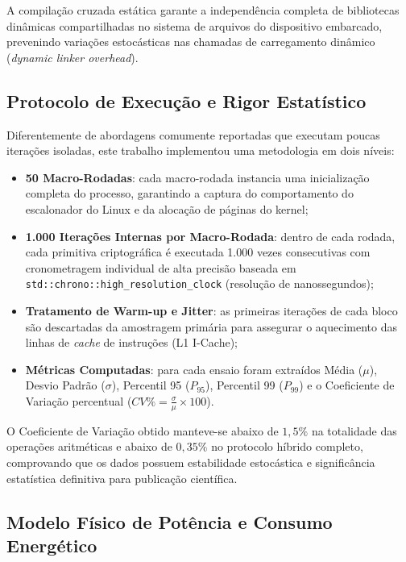 A compilação cruzada estática garante a independência completa de bibliotecas dinâmicas compartilhadas no sistema de arquivos do dispositivo embarcado, prevenindo variações estocásticas nas chamadas de carregamento dinâmico (\textit{dynamic linker overhead}).

\subsection{Protocolo de Execução e Rigor Estatístico}
\label{subsec:rigor_estatistico}

Diferentemente de abordagens comumente reportadas que executam poucas iterações isoladas, este trabalho implementou uma metodologia em dois níveis:
\begin{itemize}
    \item \textbf{50 Macro-Rodadas}: cada macro-rodada instancia uma inicialização completa do processo, garantindo a captura do comportamento do escalonador do Linux e da alocação de páginas do kernel;
    \item \textbf{1.000 Iterações Internas por Macro-Rodada}: dentro de cada rodada, cada primitiva criptográfica é executada 1.000 vezes consecutivas com cronometragem individual de alta precisão baseada em \texttt{std::chrono::high\_resolution\_clock} (resolução de nanossegundos);
    \item \textbf{Tratamento de Warm-up e Jitter}: as primeiras iterações de cada bloco são descartadas da amostragem primária para assegurar o aquecimento das linhas de \textit{cache} de instruções (L1 I-Cache);
    \item \textbf{Métricas Computadas}: para cada ensaio foram extraídos Média ($\mu$), Desvio Padrão ($\sigma$), Percentil 95 ($P_{95}$), Percentil 99 ($P_{99}$) e o Coeficiente de Variação percentual ($CV\% = \frac{\sigma}{\mu} \times 100$).
\end{itemize}

O Coeficiente de Variação obtido manteve-se abaixo de $1{,}5\%$ na totalidade das operações aritméticas e abaixo de $0{,}35\%$ no protocolo híbrido completo, comprovando que os dados possuem estabilidade estocástica e significância estatística definitiva para publicação científica.

\subsection{Modelo Físico de Potência e Consumo Energético}
\label{subsec:modelo_potencia}

